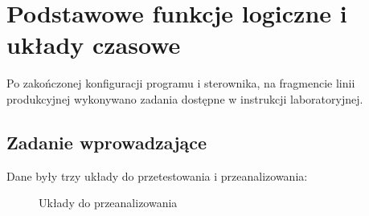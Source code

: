 \documentclass[12pt]{article}
\begin{document}
\section{Podstawowe funkcje logiczne i układy czasowe}
Po zakończonej konfiguracji programu i sterownika, na fragmencie linii produkcyjnej wykonywano zadania dostępne w instrukcji laboratoryjnej.

\subsection{Zadanie wprowadzające}
Dane były trzy układy do przetestowania i przeanalizowania:

\begin{figure}[H]
    \centering
    \quad
    \caption{Układy do przeanalizowania}
\end{figure}
\end{document}
